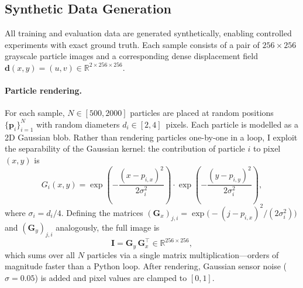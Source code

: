 \documentclass[11pt, a4paper]{article}
\newcommand{\R}{\mathbb{R}}
\newcommand{\vect}[1]{\bm{#1}}
\begin{document}
\subsection{Synthetic Data Generation}
\label{sec:data}

All training and evaluation data are generated synthetically, enabling controlled experiments with exact ground truth.
Each sample consists of a pair of $256 \times 256$ grayscale particle images and a corresponding dense displacement field $\vect{d}(x,y) = (u, v) \in \R^{2 \times 256 \times 256}$.

\paragraph{Particle rendering.}
For each sample, $N \in [500, 2000]$ particles are placed at random positions $\{\vect{p}_i\}_{i=1}^{N}$ with random diameters $d_i \in [2, 4]$~pixels.
Each particle is modelled as a 2D Gaussian blob.
Rather than rendering particles one-by-one in a loop, I exploit the separability of the Gaussian kernel: the contribution of particle $i$ to pixel $(x, y)$ is
\begin{equation}
    G_i(x, y) = \exp\!\left(-\frac{(x - p_{i,x})^2}{2\sigma_i^2}\right) \cdot \exp\!\left(-\frac{(y - p_{i,y})^2}{2\sigma_i^2}\right),
    \label{eq:gaussian_sep}
\end{equation}
where $\sigma_i = d_i / 4$.
Defining the matrices $(\vect{G}_x)_{j,i} = \exp\!\big(-\!(j - p_{i,x})^2 / (2\sigma_i^2)\big)$ and $(\vect{G}_y)_{j,i}$ analogously, the full image is
\begin{equation}
    \vect{I} = \vect{G}_y \, \vect{G}_x^\top \in \R^{256 \times 256},
    \label{eq:matmul_render}
\end{equation}
which sums over all $N$ particles via a single matrix multiplication---orders of magnitude faster than a Python loop.
After rendering, Gaussian sensor noise ($\sigma = 0.05$) is added and pixel values are clamped to $[0, 1]$.
\end{document}
